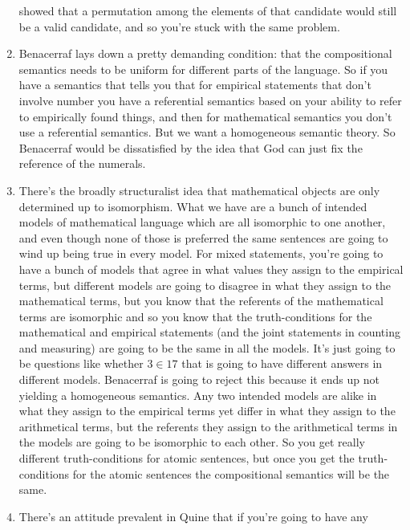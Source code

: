 \documentclass[12pt]{article}
\theoremstyle{definition}
\begin{document}
\begin{enumerate}
        showed that a permutation among the elements of that candidate would
        still be a valid candidate, and so you're stuck with the same problem.
    \item
        Benacerraf lays down a pretty demanding condition: that the
        compositional semantics needs to be uniform for different parts of the
        language. So if you have a semantics that tells you that for empirical
        statements that don't involve number you have a referential semantics
        based on your ability to refer to empirically found things, and then
        for mathematical semantics you don't use a referential semantics. But
        we want a homogeneous semantic theory. So Benacerraf would be
        dissatisfied by the idea that God can just fix the reference of the
        numerals.
    \item
        There's the broadly structuralist idea that mathematical objects are
        only determined up to isomorphism. What we have are a bunch of intended
        models of mathematical language which are all isomorphic to one
        another, and even though none of those is preferred the same sentences
        are going to wind up being true in every model. For mixed statements,
        you're going to have a bunch of models that agree in what values they
        assign to the empirical terms, but different models are going to
        disagree in what they assign to the mathematical terms, but you know
        that the referents of the mathematical terms are isomorphic and so you
        know that the truth-conditions for the mathematical and empirical
        statements (and the joint statements in counting and measuring) are
        going to be the same in all the models. It's just going to be questions
        like whether $3 \in 17$ that is going to have different answers in
        different models. Benacerraf is going to reject this because it ends up
        not yielding a homogeneous semantics. Any two intended models are alike
        in what they assign to the empirical terms yet differ in what they
        assign to the arithmetical terms, but the referents they assign to the
        arithmetical terms in the models are going to be isomorphic to each
        other. So you get really different truth-conditions for atomic
        sentences, but once you get the truth-conditions for the atomic
        sentences the compositional semantics will be the same.
    \item
        There's an attitude prevalent in Quine that if you're going to have any

\end{enumerate}
\end{document}
